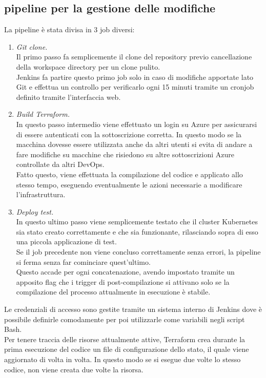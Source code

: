 \documentclass[a4paper,12pt]{report}
\begin{document}
\subsection{pipeline per la gestione delle modifiche}
La pipeline è stata divisa in 3 job diversi:\\
\begin{enumerate}
\item \textit{Git clone.} \\
Il primo passo fa semplicemente il clone del repository previo cancellazione della workspace directory per un clone pulito.\\
Jenkins fa partire questo primo job solo in caso di modifiche apportate lato Git e effettua un controllo per verificarlo ogni 15 minuti tramite un cronjob definito tramite l'interfaccia web. \\
\item \textit{Build Terraform.} \\
In questo passo intermedio viene effettuato un login su Azure per assicurarsi di essere autenticati con la sottoscrizione corretta. In questo modo se la macchina dovesse essere utilizzata anche da altri utenti si evita di andare a fare modifiche su macchine che risiedono su altre sottoscrizioni Azure controllate da altri DevOps.\\
Fatto questo, viene effettuata la compilazione del codice e applicato allo stesso tempo, eseguendo eventualmente le azioni necessarie a modificare l'infrastruttura.\\
\item \textit{Deploy test.} \\
In questo ultimo passo viene semplicemente testato che il cluster Kubernetes sia stato creato correttamente e che sia funzionante, rilasciando sopra di esso una piccola applicazione di test.\\
Se il job precedente non viene concluso correttamente senza errori, la pipeline si ferma senza far cominciare quest'ultimo.\\
Questo accade per ogni concatenazione, avendo impostato tramite un apposito flag che i trigger di post-compilazione si attivano solo se la compilazione del processo attualmente in esecuzione è stabile.\\
\end{enumerate}

Le credenziali di accesso sono gestite tramite un sistema interno di Jenkins dove è possibile definirle comodamente per poi utilizzarle come variabili negli script Bash.\\
Per tenere traccia delle risorse attualmente attive, Terraform crea durante la prima esecuzione del codice un file di configurazione dello stato, il quale viene aggiornato di volta in volta. In questo modo se si esegue due volte lo stesso codice, non viene creata due volte la risorsa.
\end{document}
